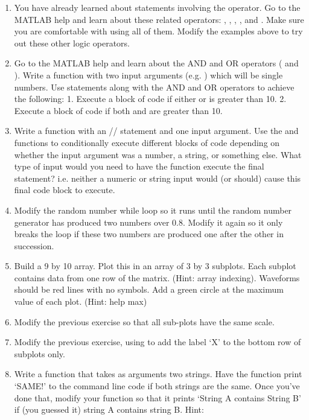 \documentclass{article}
\begin{document}
\begin{enumerate}
\item You have already learned about  statements involving the \mcode{==} operator. Go to the MATLAB help and learn about these related operators: \mcode{<}, \mcode{>}, \mcode{!=}, \mcode{>=}, and \mcode{<=}. Make sure you are comfortable with using all of them. Modify the  examples above to try out these other logic operators. 

\item Go to the MATLAB help and learn about the AND and OR operators (\mcode{&} and \mcode{\|}). Write a function with two input arguments (e.g. ) which will be single numbers. Use  statements along with the AND and OR operators to achieve the following: 1. Execute a block of code if either  or  is greater than 10.  2. Execute a block of code if both  and  are greater than 10. 

\item Write a function with an // statement and one input argument. Use the  and  functions to conditionally execute different blocks of code depending on whether the input argument was a number, a string, or something else. What type of input would you need to have the function execute the final  statement? i.e. neither a numeric or string input would (or should) cause this final code block to execute. 

\item Modify the random number while loop so it runs until the random number generator has produced two numbers over 0.8. Modify it again so it only breaks the loop if these two numbers are produced one after the other in succession. 

\item Build a 9 by 10 array. Plot this in an array of 3 by 3 subplots. Each subplot contains data from one row of the matrix. (Hint: array indexing). Waveforms should be red lines with no symbols. Add a green circle at the maximum value of each plot. (Hint: help max)

\item Modify the previous exercise so that all sub-plots have the same scale. 

\item Modify the previous exercise, using  to add the label `X' to the bottom row of subplots only. 

\item Write a function that takes as arguments two strings. Have the function print `SAME!' to the command line code if both strings are the same. Once you've done that,  modify your function so that it prints `String A contains String B' if (you guessed it) string A contains string B. Hint: 

\end{enumerate}
\end{document}
